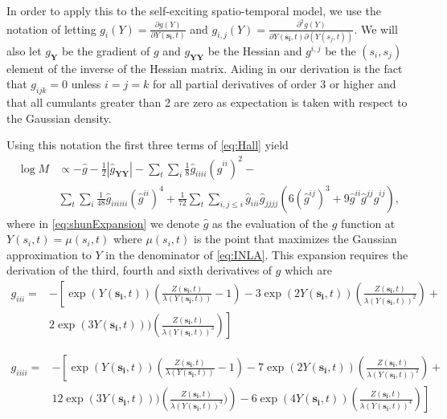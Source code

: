 \documentclass[11pt]{isuthesis}
\begin{document}
	In order to apply this to the self-exciting spatio-temporal model, we use the notation of \cite{evangelou2011estimation} letting $g_i(Y)= \frac{\partial g(Y)}{\partial Y(\boldsymbol{s_i},t)}$ and $g_{i,j}(Y)=\frac{\partial^2 g(Y)}{\partial Y(\boldsymbol{s_i},t) \partial(Y(s_j,t))}$.  We will also let $g_{\boldsymbol{Y}}$ be the gradient of $g$ and $g_{\boldsymbol{YY}}$ be the Hessian and $g^{i,j}$ be the $(s_i,s_j)$ element of the inverse of the Hessian matrix.  Aiding in our derivation is the fact that $g_{ijk}=0$ unless $i=j=k$ for all partial derivatives of order 3 or higher and that all cumulants greater than 2 are zero as expectation is taken with respect to the Gaussian density.
	
	Using this notation the first three terms of \eqref{eq:Hall} yield
	 \begin{align}
	 \log M & \propto -\hat{g}-\frac{1}{2}|\hat{g}_{\boldsymbol{YY}}|-\sum_{t}\sum_{i}\frac{1}{8}\hat{g}_{iiii}(\hat{g}^{ii})^2- \nonumber\\
	 &\sum_{t}\sum_{i}\frac{1}{48}\hat{g}_{iiiiii}(\hat{g}^{ii})^4 +
	 \frac{1}{72}\sum_{t}\sum_{i,j\leq i}\hat{g}_{iii}\hat{g}_{jjjj}\left(6 \left(\hat{g}^{ij}\right)^3+9 \hat{g}^{ii}\hat{g}^{jj}\hat{g}^{ij}\right) \label{eq:shunExpansion},
	 \end{align}
	 where in \eqref{eq:shunExpansion} we denote $\hat{g}$ as the evaluation of the $g$ function at $Y(s_i,t)=\mu(s_i,t)$ where $\mu(s_i,t)$ is the point that maximizes the Gaussian approximation to $Y$ in the denominator of \eqref{eq:INLA}. This expansion requires the derivation of the third, fourth and sixth derivatives of $g$ which are
	\begin{align}
	g_{iii}=  &-\left[\exp(Y(\boldsymbol{s_i},t))\left(\frac{Z(\boldsymbol{s_i},t)}{\lambda(Y(\boldsymbol{s_i},t))}-1\right)-3\exp(2 Y(\boldsymbol{s_i},t))\left(\frac{ Z(\boldsymbol{s_i},t)}{\lambda(Y(\boldsymbol{s_i},t))^2}\right)+\right.\nonumber\\
	& \left. 2\exp(3Y(\boldsymbol{s_i},t)))\left(\frac{ Z(\boldsymbol{s_i},t)}{\lambda(Y(\boldsymbol{s_i},t))^3}\right)\right] \label{eq:thirds}
	\end{align}
	
	\begin{align}
	g_{iiii}=  &-\left[\exp(Y(\boldsymbol{s_i},t))\left(\frac{ Z(\boldsymbol{s_i},t)}{\lambda(Y(\boldsymbol{s_i},t))}-1\right)-7\exp(2 Y(\boldsymbol{s_i},t))\left(\frac{Z(\boldsymbol{s_i},t)}{\lambda(Y(\boldsymbol{s_i},t))^2}\right)+\right.\nonumber\\
	& \left. 12\exp(3Y(\boldsymbol{s_i},t)))\left(\frac{ Z(\boldsymbol{s_i},t)}{\lambda(Y(\boldsymbol{s_i},t))^3})\right)-6\exp(4Y(\boldsymbol{s_i},t))\left(\frac{ Z(\boldsymbol{s_i},t)}{\lambda(Y(\boldsymbol{s_i},t))^4}\right)\right] \label{eq:fourths}
	\end{align}
	
\end{document}
